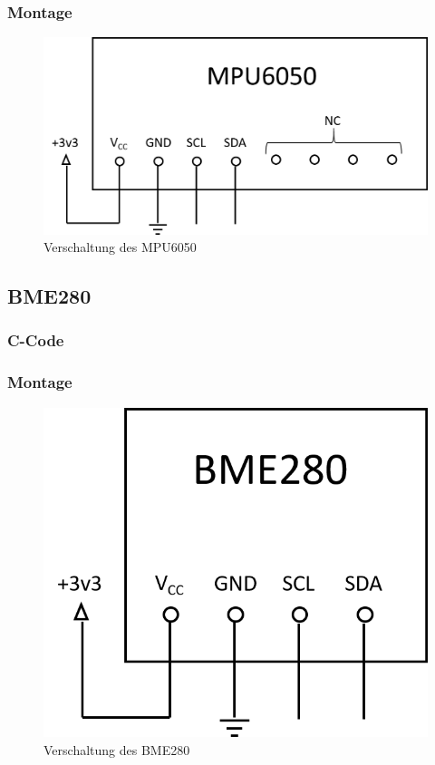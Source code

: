 \subsubsection{Montage}

\begin{figure}[H]
  \centering
  \includegraphics[width=\textwidth]{./img/MPU6050_Plan.png}
  \caption{Verschaltung des MPU6050}\label{fig:MPU6050_Plan}
\end{figure}

\subsection{BME280}

\subsubsection{C-Code}

\subsubsection{Montage}

\begin{figure}[H]
  \centering
  \includegraphics[width=\textwidth]{./img/BME280_Plan.png}
  \caption{Verschaltung des BME280}\label{fig:BME280_Plan}
\end{figure}
